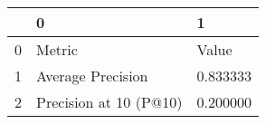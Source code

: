 \begin{tabular}{lll}
\toprule
 & 0 & 1 \\
\midrule
0 & Metric & Value \\
1 & Average Precision & 0.833333 \\
2 & Precision at 10 (P@10) & 0.200000 \\
\bottomrule
\end{tabular}
